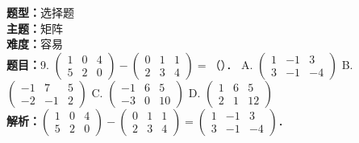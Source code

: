 \documentclass{ctexart}
\newenvironment{question}[5]{%
	\noindent\textbf{题型：}#1\\
	\textbf{主题：}#2\\
	\textbf{难度：}#3\\
	\textbf{题目：}#4\\
	\textbf{解析：}#5\\
	\vspace{1em}
}{}
\begin{document}
	\begin{question}
		{选择题}
		{矩阵}
		{容易}
		{9. \(\left(\begin{array}{lll}1 & 0 & 4 \\ 5 & 2 & 0\end{array}\right)-\left(\begin{array}{lll}0 & 1 & 1 \\ 2 & 3 & 4\end{array}\right)=\)（）．
			A. \(\left(\begin{array}{ccc}1 & -1 & 3 \\ 3 & -1 & -4\end{array}\right)\)
			B. \(\left(\begin{array}{ccc}-1 & 7 & 5 \\ -2 & -1 & 2\end{array}\right)\)
			C. \(\left(\begin{array}{ccc}-1 & 6 & 5 \\ -3 & 0 & 10\end{array}\right)\)
			D. \(\left(\begin{array}{ccc}1 & 6 & 5 \\ 2 & 1 & 12\end{array}\right)\)}
		{\(\left(\begin{array}{lll}1 & 0 & 4 \\ 5 & 2 & 0\end{array}\right)-\left(\begin{array}{lll}0 & 1 & 1 \\ 2 & 3 & 4\end{array}\right)=\left(\begin{array}{ccc}1 & -1 & 3 \\ 3 & -1 & -4\end{array}\right)\)．}
	\end{question}
	
\end{document}
